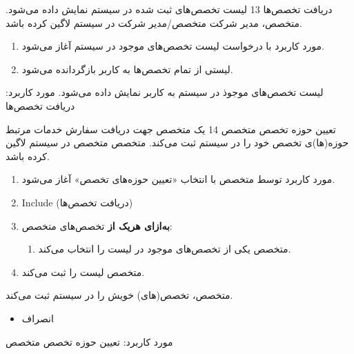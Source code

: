 
\usecase
{دریافت تخصص‌ها}
{13}
{لیست تخصص‌های ثبت شده در سیستم نمایش داده می‌شود.}
{متخصص، مدیر شرکت}
{}
{متخصص/مدیر شرکت در سیستم لاگین کرده باشد.}
{
	\vspace*{-0.6cm}
	\begin{enumerate}
		\item مورد کاربرد با درخواست لیست تخصص‌های موجود در سیستم آغاز می‌شود.
		\item لیستی از تمام تخصص‌ها به کاربر بازگردانده می‌شود.
	\end{enumerate}
}
{لیست تخصص‌های موجوذ در سیستم به کاربر نمایش داده می‌شود.}
{
}
{
	مورد کاربرد: دریافت تخصص‌ها
}


\usecase
{تعیین حوزه تخصص متخصص}
{14}
{یک متخصص جهت دریافت سفارش خدمات مرتبط حوزه‌(ها)ی تخصص خود را در سیستم ثبت می‌کند.}
{متخصص}
{}
{متخصص در سیستم لاگین کرده باشد.}
{
	\vspace*{-0.6cm}
	\begin{enumerate}
		\item مورد کاربرد توسط متخصص با انتخاب «تعیین حوزه‌های تخصص» آغاز می‌شود.
		\item Include (دریافت تخصص‌ها)
		\item 
		\textbf{به‌ازای هریک از}
		تخصص‌های متخصص:
		\begin{enumerate}[label=\theenumi.\arabic*.]
			\item متخصص یکی از تخصص‌های موجود در لیست را انتخاب می‌کند.
		\end{enumerate}
		\item 
		متخصص لیست را ثبت می‌کند.
	\end{enumerate}
}
{متخصص، تخصص(های) خویش را در سیستم ثبت می‌کند.}
{
	\begin{itemize}
		\vspace*{-0.6cm}
		\item انصراف
	\end{itemize}
}
{
	مورد کاربرد: تعیین حوزه تخصص متخصص
}


